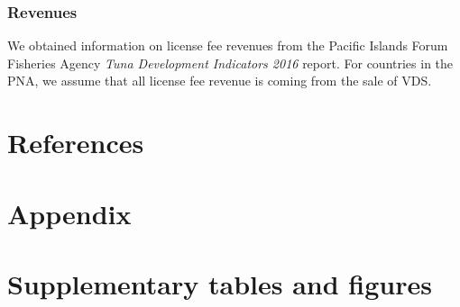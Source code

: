 \documentclass[9p,twocolumn,twoside,lineno]{pnas-new}
\begin{document}
\begin{scriptsize}
\subsubsection{Revenues}

We obtained information on license fee revenues from the Pacific Islands Forum Fisheries Agency \emph{Tuna Development Indicators 2016} report. For countries in the PNA, we assume that all license fee revenue is coming from the sale of VDS.

\end{scriptsize}

\section{References}




\clearpage

\onecolumn

\FloatBarrier

\section{Appendix}\label{appendix}



\newcommand{\beginsupplement}{\setcounter{table}{0}  \renewcommand{\thetable}{S\arabic{table}} \setcounter{figure}{0} \renewcommand{\thefigure}{S\arabic{figure}}}

\setcounter{table}{0}  \renewcommand{\thetable}{S\arabic{table}} \setcounter{figure}{0} \renewcommand{\thefigure}{S\arabic{figure}}

\section{Supplementary tables and figures}




\end{document}
